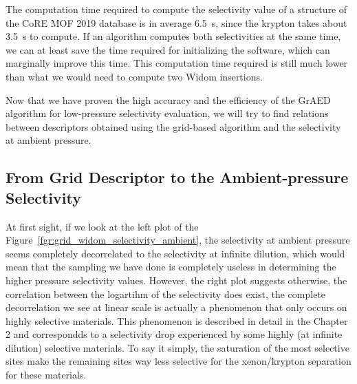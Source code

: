 \documentclass[main]{subfiles}
\begin{document}
The computation time required to compute the selectivity value of a structure of the CoRE MOF 2019 database is in average \SI{6.5}{\second}, since the krypton takes about \SI{3.5}{\second} to compute. If an algorithm computes both selectivities at the same time, we can at least save the time required for initializing the software, which can marginally improve this time. This computation time required is still much lower than what we would need to compute two Widom insertions.

Now that we have proven the high accuracy and the efficiency of the GrAED algorithm for low-pressure selectivity evaluation, we will try to find relations between descriptors obtained using the grid-based algorithm and the selectivity at ambient pressure.

\subsection{From Grid Descriptor to the Ambient-pressure Selectivity}

At first sight, if we look at the left plot of the Figure~\ref{fgr:grid_widom_selectivity_ambient}, the selectivity at ambient pressure seems completely decorrelated to the selectivity at infinite dilution, which would mean that the sampling we have done is completely useless in determining the higher pressure selectivity values. However, the right plot suggests otherwise, the correlation between the logartihm of the selectivity does exist, the complete decorrelation we see at linear scale is actually a phenomenon that only occurs on highly selective materials. This phenomenon is described in detail in the Chapter 2 and correspondds to a selectivity drop experienced by some highly (at infinite dilution) selective materials. To say it simply, the saturation of the most selective sites make the remaining sites way less selective for the xenon/krypton separation for these materials.
\end{document}
